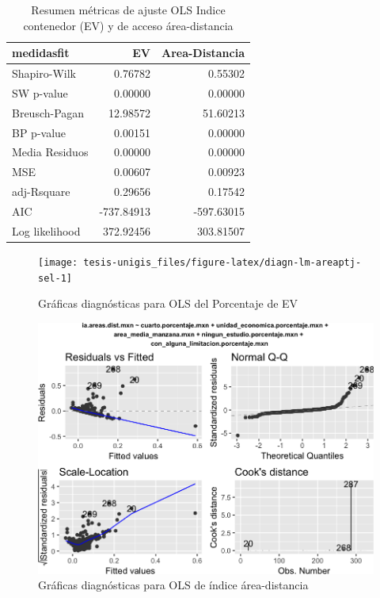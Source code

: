 \documentclass[12pt,a4paper,openany]{book}
\theoremstyle{definition}
\theoremstyle{definition}
\theoremstyle{definition}
\theoremstyle{remark}
\begin{document}
\begin{table}[t]

\caption{\label{tab:ajuste-lmev-pob-predios}Resumen métricas de ajuste OLS Indice contenedor (EV) y de acceso área-distancia }
\centering
\begin{tabular}{lrr}
\toprule
medidasfit & EV & Area-Distancia\\
\midrule
Shapiro-Wilk & 0.76782 & 0.55302\\
SW p-value & 0.00000 & 0.00000\\
Breusch-Pagan & 12.98572 & 51.60213\\
BP p-value & 0.00151 & 0.00000\\
Media Residuos & 0.00000 & 0.00000\\
\addlinespace
MSE & 0.00607 & 0.00923\\
adj-Rsquare & 0.29656 & 0.17542\\
AIC & -737.84913 & -597.63015\\
Log likelihood & 372.92456 & 303.81507\\
\bottomrule
\end{tabular}
\end{table}

\begin{figure}

{\centering \texttt{[image: tesis-unigis\_files/figure-latex/diagn-lm-areaptj-sel-1]} 

}

\caption{Gráficas diagnósticas para OLS del Porcentaje de EV }\label{fig:diagn-lm-areaptj-sel}
\end{figure}

\begin{figure}

{\centering \includegraphics[width=1\linewidth]{tesis-unigis_files/figure-latex/diagn-lm-areadist-sel-1} 

}

\caption{Gráficas diagnósticas para OLS de índice área-distancia}\label{fig:diagn-lm-areadist-sel}
\end{figure}
\end{document}
